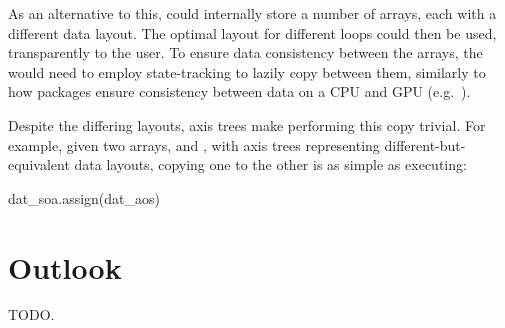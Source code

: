 \documentclass[thesis]{subfiles}
\begin{document}
As an alternative to this,   could internally store a number of arrays, each with a different data layout.
The optimal layout for different loops could then be used, transparently to the user.
To ensure data consistency between the arrays, the  would need to employ state-tracking to lazily copy between them, similarly to how packages ensure consistency between data on a CPU and GPU (e.g.~\cite{millsPerformancePortablePETScGPUbased2020}).

Despite the differing layouts, axis trees make performing this copy trivial.
For example, given two arrays,  and , with axis trees representing different-but-equivalent data layouts, copying one to the other is as simple as executing:
\begin{pyinline}
  dat_soa.assign(dat_aos)
\end{pyinline}

\section{Outlook}

TODO.
\end{document}
